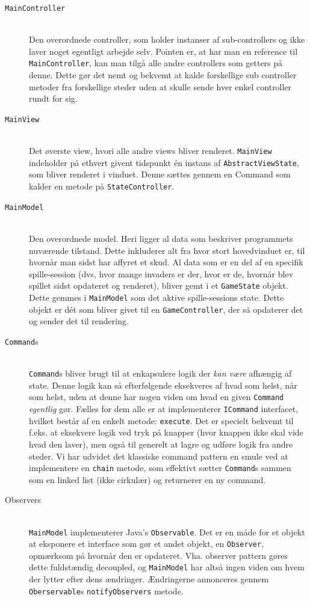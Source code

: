 \documentclass[titlepage,danish]{article}
\newcommand{\code}[1]{\texttt{#1}}
\begin{document}
\begin{description}
\item[\code{MainController}] \hfill \\
  Den overordnede controller, som holder instanser af sub-controllers og ikke laver noget egentligt
  arbejde selv. Pointen er, at har man en reference til \code{MainController}, kan man tilgå alle
  andre controllers som getters på denne. Dette gør det nemt og bekvemt at kalde forskellige sub
  controller metoder fra forskellige steder uden at skulle sende hver enkel controller rundt for
  sig.

\item[\code{MainView}]  \hfill \\
  Det øverste view, hvori alle andre views bliver renderet. \code{MainView} indeholder på ethvert
  givent tidspunkt én instans af \code{AbstractViewState}, som bliver renderet i vinduet. Denne
  sættes gennem en Command som kalder en metode på \code{StateController}.

\item[\code{MainModel}]  \hfill \\
  Den overordnede model. Heri ligger al data som beskriver programmets nuværende tilstand. Dette
  inkluderer alt fra hvor stort hovedvinduet er, til hvornår man sidst har affyret et skud. Al data
  som er en del af en specifik spille-session (dvs, hvor mange invaders er der, hvor er de, hvornår
  blev spillet sidst opdateret og renderet), bliver gemt i et \code{GameState} objekt. Dette gemmes
  i \code{MainModel} som det aktive spille-sessions state. Dette objekt er dét som bliver givet til
  en \code{GameController}, der så opdaterer det og sender det til rendering.

\item[\code{Command}s] \hfill \\
  \code{Command}s bliver brugt til at enkapsulere logik der \emph{kan være} afhængig af state. Denne
  logik kan så efterfølgende eksekveres af hvad som helst, når som helst, uden at denne har nogen
  viden om hvad en given \code{Command} \emph{egentlig} gør. Fælles for dem alle er at implementerer
  \code{ICommand} interfacet, hvilket består af en enkelt metode: \code{execute}.  Det er specielt
  bekvemt til f.eks. at eksekvere logik ved tryk på knapper (hvor knappen ikke skal vide hvad den
  laver), men også til generelt at lagre og udføre logik fra andre steder.  Vi har udvidet det klassiske
  command pattern en smule ved at implementere en \code{chain} metode, som effektivt sætter
  \code{Command}s sammen som en linked list (ikke cirkulær) og returnerer en ny command.

\item[Observers] \hfill \\
  \code{MainModel} implementerer Java's \code{Observable}. Det er en måde for et objekt at eksponere
  et interface som gør et andet objekt, en \code{Observer}, opmærksom på hvornår den er
  opdateret. Vha. observer pattern gøres dette fuldstændig decoupled, og \code{MainModel} har altså
  ingen viden om hvem der lytter efter dens ændringer. Ændringerne annonceres gennem
  \code{Oberservable}s \code{notifyObservers} metode.
\end{description}
\end{document}
